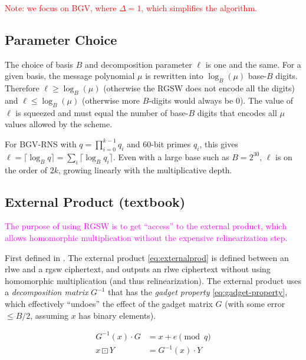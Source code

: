 

\ifnotes
\noindent\textcolor{red}{Note: we focus on BGV, where $\Delta = 1$, which simplifies the algorithm.}
\fi

\subsection{Parameter Choice}
\label{sec:rgsw:params}

The choice of basis $B$ and decomposition parameter $\ell$ is one and the same. For a given basis, the message polynomial $\mu$ is rewritten into $\log_B(\mu)$ base-$B$ digits. Therefore $\ell \geq \log_B(\mu)$ (otherwise the RGSW does not encode all the digits) and $\ell \leq \log_B(\mu)$ (otherwise more $B$-digits would always be 0). The value of $\ell$ is squeezed and must equal the number of base-$B$ digits that encodes all $\mu$ values allowed by the scheme.

For BGV-RNS with $q = \prod_{i=0}^{k-1} q_i$ and 60-bit primes $q_i$, this gives $\ell = \lceil \log_B q \rceil = \sum_i \lceil \log_B q_i \rceil$. Even with a large base such as $B = 2^{30}$, $\ell$ is on the order of $2k$, growing linearly with the multiplicative depth.

\subsection{External Product (textbook)}
\label{sec:rgsw:extprod}

\ifnotes
\textcolor{magenta}{The purpose of using RGSW is to get ``access'' to the external product, which allows homomorphic multiplication without the expensive relinearization step.}
\fi

First defined in \cite{cryptoeprint:2018/421}. The external product \eqref{eq:externalprod} is defined between an \gls{rlwe} and a \gls{rgsw} ciphertext, and outputs an \gls{rlwe} ciphertext without using homomorphic multiplication (and thus relinearization). The external product uses a \emph{decomposition matrix} $G^{-1}$ that has the \emph{gadget property} \eqref{eq:gadget-property}, which effectively ``undoes'' the effect of the gadget matrix $G$ (with some error $\leq B/2$, assuming $x$ has binary elements).

\begin{align}
    \label{eq:gadget-property}
    G^{-1}(x)\cdot G &= x + e \pmod{q} \\
    \label{eq:externalprod}
    x \boxdot Y &= G^{-1}(x)\cdot Y
\end{align}

